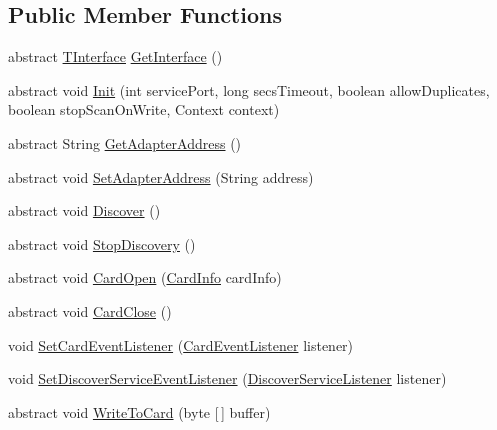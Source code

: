 \subsection*{Public Member Functions}
\begin{DoxyCompactItemize}
\item 
abstract \mbox{\hyperlink{enumcom_1_1ethernom_1_1android_1_1etherapi_1_1link_layer_1_1_t_interface}{T\+Interface}} \mbox{\hyperlink{classcom_1_1ethernom_1_1android_1_1etherapi_1_1link_layer_1_1_ether_comm_adapter_ad6522d7705f367397d96990212ce4811}{Get\+Interface}} ()
\item 
abstract void \mbox{\hyperlink{classcom_1_1ethernom_1_1android_1_1etherapi_1_1link_layer_1_1_ether_comm_adapter_a165ef052bf2b43fd4cfb6d058782dc56}{Init}} (int service\+Port, long secs\+Timeout, boolean allow\+Duplicates, boolean stop\+Scan\+On\+Write, Context context)
\item 
abstract String \mbox{\hyperlink{classcom_1_1ethernom_1_1android_1_1etherapi_1_1link_layer_1_1_ether_comm_adapter_a53f4849bcccd6ef8b4026d94710402c9}{Get\+Adapter\+Address}} ()
\item 
abstract void \mbox{\hyperlink{classcom_1_1ethernom_1_1android_1_1etherapi_1_1link_layer_1_1_ether_comm_adapter_a1015540b8402955344b81fd14b40c316}{Set\+Adapter\+Address}} (String address)
\item 
abstract void \mbox{\hyperlink{classcom_1_1ethernom_1_1android_1_1etherapi_1_1link_layer_1_1_ether_comm_adapter_a9f7491d2b2afa68da62fafc5d89e360b}{Discover}} ()
\item 
abstract void \mbox{\hyperlink{classcom_1_1ethernom_1_1android_1_1etherapi_1_1link_layer_1_1_ether_comm_adapter_acca97182df90976a030684b62c871131}{Stop\+Discovery}} ()
\item 
abstract void \mbox{\hyperlink{classcom_1_1ethernom_1_1android_1_1etherapi_1_1link_layer_1_1_ether_comm_adapter_af0899f88b78f1072650148201cd8bf1d}{Card\+Open}} (\mbox{\hyperlink{classcom_1_1ethernom_1_1android_1_1etherapi_1_1_card_info}{Card\+Info}} card\+Info)
\item 
abstract void \mbox{\hyperlink{classcom_1_1ethernom_1_1android_1_1etherapi_1_1link_layer_1_1_ether_comm_adapter_a65686a9a7033d40dfc093189eadb602c}{Card\+Close}} ()
\item 
void \mbox{\hyperlink{classcom_1_1ethernom_1_1android_1_1etherapi_1_1link_layer_1_1_ether_comm_adapter_a1f7f6961c42491f67d7fd9e7c187340c}{Set\+Card\+Event\+Listener}} (\mbox{\hyperlink{classcom_1_1ethernom_1_1android_1_1etherapi_1_1link_layer_1_1_card_event_listener}{Card\+Event\+Listener}} listener)
\item 
void \mbox{\hyperlink{classcom_1_1ethernom_1_1android_1_1etherapi_1_1link_layer_1_1_ether_comm_adapter_a57af184b11f4ccd518e6abcea71438fd}{Set\+Discover\+Service\+Event\+Listener}} (\mbox{\hyperlink{interfacecom_1_1ethernom_1_1android_1_1etherapi_1_1_discover_service_listener}{Discover\+Service\+Listener}} listener)
\item 
abstract void \mbox{\hyperlink{classcom_1_1ethernom_1_1android_1_1etherapi_1_1link_layer_1_1_ether_comm_adapter_accd54674d191e15ebf08a7c8e7a8d8e9}{Write\+To\+Card}} (byte \mbox{[}$\,$\mbox{]} buffer)
\end{DoxyCompactItemize}
